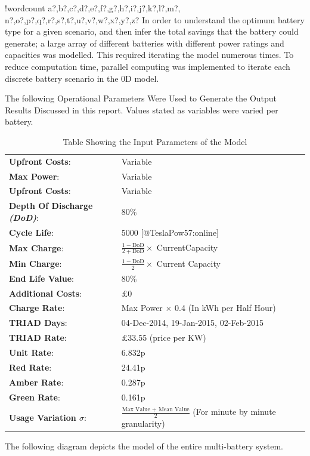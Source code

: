 \documentclass[fontsize=9.5pt]{extarticle}
\numberwithin{figure}{section} %
\newcounter{words}
\newenvironment{counted}{%
  \setcounter{words}{0}
  \SearchList!{wordcount}{\stepcounter{words}}
    {a?,b?,c?,d?,e?,f?,g?,h?,i?,j?,k?,l?,m?,
    n?,o?,p?,q?,r?,s?,t?,u?,v?,w?,x?,y?,z?}
  \UndoBoundary{'}
  \SearchOrder{p;}}{%
  \StopSearching}
\begin{document}
\begin{counted}
In order to understand the optimum battery type for a given scenario,
and then infer the total savings that the battery could generate; a
large array of different batteries with different power ratings and
capacities was modelled. This required iterating the model numerous
times. To reduce computation time, parallel computing was implemented to
iterate each discrete battery scenario in the 0D model.

The following Operational Parameters Were Used to Generate the Output
Results Discussed in this report. Values stated as variables were varied
per battery.

\begin{table}[H]
\begin{tabular}{p{4.3cm}p{8cm}}
\textbf{Upfront Costs}:& Variable\\
\textbf{Max Power}:& Variable\\
\textbf{Upfront Costs}:& Variable\\
\textbf{Depth Of Discharge \textit{(DoD)}}:& 80\% \\
\textbf{Cycle Life}:& 5000 [@TeslaPow57:online]\\
\textbf{Max Charge}:& $\frac{1-\text{DoD}}{2+\text{DoD}} \times$ CurrentCapacity\\
\textbf{Min Charge}:& $\frac{1-\text{DoD}}{2} \times$ Current Capacity\\
\textbf{End Life Value}:& 80\%\\
\textbf{Additional Costs}:& £0 \\
\textbf{Charge Rate}:& Max Power $\times$ 0.4 (In kWh per Half Hour)\\
\textbf{TRIAD Days}:& 04-Dec-2014, 19-Jan-2015, 02-Feb-2015\\
\textbf{TRIAD Rate}:& £33.55  (price per KW)\\
\textbf{Unit Rate}:&  6.832p\\
\textbf{Red Rate}:&  24.41p\\
\textbf{Amber Rate}:&  0.287p\\
\textbf{Green Rate}:&  0.161p\\
\textbf{Usage Variation $\sigma$}:&  $\frac{\text{Max Value + Mean Value}}{2}$ (For minute by minute granularity)
\end{tabular}
\label{inputparam}
\caption{Table Showing the Input Parameters of the Model}
\end{table}

The following diagram depicts the model of the entire multi-battery
system.


\end{counted}
\end{document}
